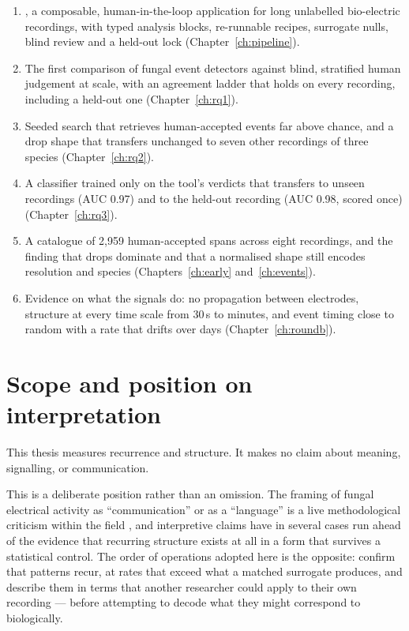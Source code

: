\begin{enumerate}
  \item \tool{}, a composable, human-in-the-loop application for long unlabelled bio-electric recordings, with typed analysis blocks, re-runnable recipes, surrogate nulls, blind review and a held-out lock (Chapter~\ref{ch:pipeline}).
  \item The first comparison of fungal event detectors against blind, stratified human judgement at scale, with an agreement ladder that holds on every recording, including a held-out one (Chapter~\ref{ch:rq1}).
  \item Seeded search that retrieves human-accepted events far above chance, and a drop shape that transfers unchanged to seven other recordings of three species (Chapter~\ref{ch:rq2}).
  \item A classifier trained only on the tool's verdicts that transfers to unseen recordings (AUC 0.97) and to the held-out recording (AUC 0.98, scored once) (Chapter~\ref{ch:rq3}).
  \item A catalogue of 2,959 human-accepted spans across eight recordings, and the finding that drops dominate and that a normalised shape still encodes resolution and species (Chapters~\ref{ch:early} and~\ref{ch:events}).
  \item Evidence on what the signals do: no propagation between electrodes, structure at every time scale from 30\,s to minutes, and event timing close to random with a rate that drifts over days (Chapter~\ref{ch:roundb}).
\end{enumerate}

\section{Scope and position on interpretation}
\label{sec:position}

This thesis measures recurrence and structure. It makes no claim about meaning, signalling, or communication.

This is a deliberate position rather than an omission. The framing of fungal electrical activity as ``communication'' or as a ``language'' is a live methodological criticism within the field \cite{buffi2025review}, and interpretive claims have in several cases run ahead of the evidence that recurring structure exists at all in a form that survives a statistical control. The order of operations adopted here is the opposite: confirm that patterns recur, at rates that exceed what a matched surrogate produces, and describe them in terms that another researcher could apply to their own recording --- before attempting to decode what they might correspond to biologically.

